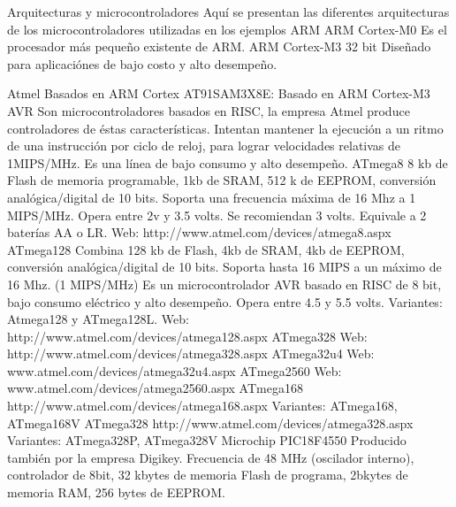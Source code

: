 

Arquitecturas y microcontroladores
Aquí se presentan las diferentes arquitecturas de los microcontroladores utilizadas en los ejemplos 
ARM
ARM Cortex-M0
Es el procesador más pequeño existente de ARM.
ARM Cortex-M3 32 bit
Diseñado para aplicaciónes de bajo costo y alto desempeño.

Atmel
Basados en ARM Cortex
AT91SAM3X8E:  Basado en ARM Cortex-M3
AVR
Son microcontroladores basados en RISC, la empresa Atmel produce controladores de éstas características. Intentan mantener la ejecución a un ritmo de una instrucción por ciclo de reloj, para lograr velocidades relativas de 1MIPS/MHz. Es una línea de bajo consumo y alto desempeño.
ATmega8
8 kb de Flash de memoria programable, 1kb de SRAM, 512 k de EEPROM, conversión analógica/digital de 10 bits.
Soporta una frecuencia máxima de 16 Mhz a 1 MIPS/MHz.
Opera entre 2v y 3.5 volts. Se recomiendan 3 volts. Equivale a 2 baterías AA o LR.
Web: http://www.atmel.com/devices/atmega8.aspx
ATmega128
Combina 128 kb de Flash, 4kb de SRAM, 4kb de EEPROM, conversión analógica/digital de 10 bits. Soporta hasta 16 MIPS a un máximo de 16 Mhz. (1 MIPS/MHz)
Es un microcontrolador AVR basado en RISC de 8 bit, bajo consumo eléctrico y alto desempeño.
Opera entre 4.5 y 5.5 volts.
Variantes: Atmega128 y ATmega128L.
Web: http://www.atmel.com/devices/atmega128.aspx
ATmega328
Web: http://www.atmel.com/devices/atmega328.aspx
ATmega32u4
Web: www.atmel.com/devices/atmega32u4.aspx‎
ATmega2560
Web: www.atmel.com/devices/atmega2560.aspx
ATmega168
http://www.atmel.com/devices/atmega168.aspx
Variantes: ATmega168, ATmega168V
ATmega328
http://www.atmel.com/devices/atmega328.aspx‎ 
Variantes: ATmega328P, ATmega328V
Microchip
PIC18F4550
Producido también por la empresa Digikey. Frecuencia de 48 MHz (oscilador interno), controlador de 8bit, 32 kbytes de memoria Flash de programa, 2bkytes de memoria RAM, 256 bytes de EEPROM. 
